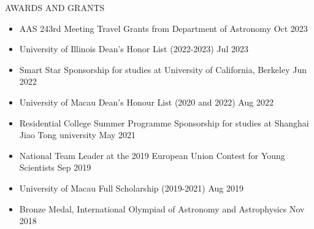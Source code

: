 \documentclass[10pt]{article} %
\begin{document}
\begin{section}{AWARDS AND GRANTS}

    \begin{itemize}[leftmargin=1.5em]
        \item AAS 243rd Meeting Travel Grants from Department of Astronomy \hfill Oct 2023
        \item University of Illinois Dean's Honor List (2022-2023) \hfill Jul 2023
        \item Smart Star Sponsorship for studies at University of California, Berkeley \hfill Jun 2022
        \item University of Macau Dean's Honour List (2020 and 2022) \hfill Aug 2022
        \item Residential College Summer Programme Sponsorship for studies at Shanghai Jiao Tong university \hfill May 2021
        \item National Team Leader at the 2019 European Union Contest for Young Scientists \hfill Sep 2019
        \item University of Macau Full Scholarship (2019-2021) \hfill Aug 2019
        \item Bronze Medal, International Olympiad of Astronomy and Astrophysics \hfill Nov 2018
    \end{itemize}
        
\end{section}
\end{document}
